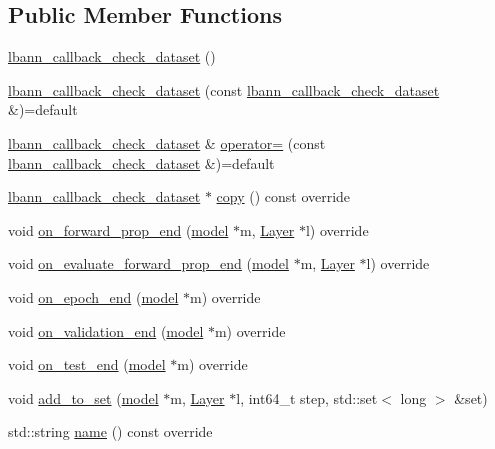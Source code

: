 \subsection*{Public Member Functions}
\begin{DoxyCompactItemize}
\item 
\hyperlink{classlbann_1_1lbann__callback__check__dataset_a79beae9767b50f7141bc5209ef5d696f}{lbann\+\_\+callback\+\_\+check\+\_\+dataset} ()
\item 
\hyperlink{classlbann_1_1lbann__callback__check__dataset_a453a843f6506051881b334760817467f}{lbann\+\_\+callback\+\_\+check\+\_\+dataset} (const \hyperlink{classlbann_1_1lbann__callback__check__dataset}{lbann\+\_\+callback\+\_\+check\+\_\+dataset} \&)=default
\item 
\hyperlink{classlbann_1_1lbann__callback__check__dataset}{lbann\+\_\+callback\+\_\+check\+\_\+dataset} \& \hyperlink{classlbann_1_1lbann__callback__check__dataset_a2b9ab1194196d9edc76eb89bc81257b8}{operator=} (const \hyperlink{classlbann_1_1lbann__callback__check__dataset}{lbann\+\_\+callback\+\_\+check\+\_\+dataset} \&)=default
\item 
\hyperlink{classlbann_1_1lbann__callback__check__dataset}{lbann\+\_\+callback\+\_\+check\+\_\+dataset} $\ast$ \hyperlink{classlbann_1_1lbann__callback__check__dataset_a8be592f1687aea003986c874dc5f7516}{copy} () const override
\item 
void \hyperlink{classlbann_1_1lbann__callback__check__dataset_acedc222fc108c156d089f1baa8c040af}{on\+\_\+forward\+\_\+prop\+\_\+end} (\hyperlink{classlbann_1_1model}{model} $\ast$m, \hyperlink{classlbann_1_1Layer}{Layer} $\ast$l) override
\item 
void \hyperlink{classlbann_1_1lbann__callback__check__dataset_a1223f07081d495d971cdf205f892c50d}{on\+\_\+evaluate\+\_\+forward\+\_\+prop\+\_\+end} (\hyperlink{classlbann_1_1model}{model} $\ast$m, \hyperlink{classlbann_1_1Layer}{Layer} $\ast$l) override
\item 
void \hyperlink{classlbann_1_1lbann__callback__check__dataset_a8cbc105d8bd9d3b493ef34de7c387929}{on\+\_\+epoch\+\_\+end} (\hyperlink{classlbann_1_1model}{model} $\ast$m) override
\item 
void \hyperlink{classlbann_1_1lbann__callback__check__dataset_a9bcb1368152c621c4484136ec8eecff8}{on\+\_\+validation\+\_\+end} (\hyperlink{classlbann_1_1model}{model} $\ast$m) override
\item 
void \hyperlink{classlbann_1_1lbann__callback__check__dataset_afe1fda5a6bfe632dc680230cc56dff3e}{on\+\_\+test\+\_\+end} (\hyperlink{classlbann_1_1model}{model} $\ast$m) override
\item 
void \hyperlink{classlbann_1_1lbann__callback__check__dataset_a17aff74d9926e07bfa1f090ad39bb4b6}{add\+\_\+to\+\_\+set} (\hyperlink{classlbann_1_1model}{model} $\ast$m, \hyperlink{classlbann_1_1Layer}{Layer} $\ast$l, int64\+\_\+t step, std\+::set$<$ long $>$ \&set)
\item 
std\+::string \hyperlink{classlbann_1_1lbann__callback__check__dataset_a150273f878be4d4bf0cdcaf0ba52aef2}{name} () const override
\end{DoxyCompactItemize}
